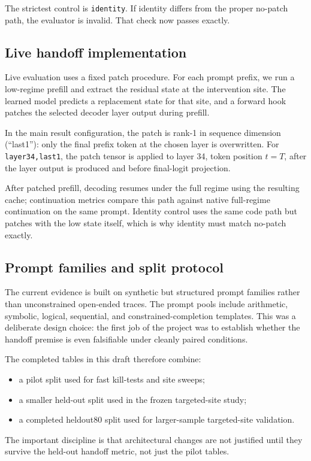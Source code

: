 \documentclass[11pt]{article}
\newcommand{\method}[1]{\texttt{#1}}
\begin{document}
The strictest control is \method{identity}. If identity differs from the proper no-patch path, the evaluator is invalid. That check now passes exactly.

\subsection{Live handoff implementation}
Live evaluation uses a fixed patch procedure. For each prompt prefix, we run a low-regime prefill and extract the residual state at the intervention site. The learned model predicts a replacement state for that site, and a forward hook patches the selected decoder layer output during prefill.

In the main result configuration, the patch is rank-1 in sequence dimension (``last1''): only the final prefix token at the chosen layer is overwritten. For \method{layer34,last1}, the patch tensor is applied to layer 34, token position $t=T$, after the layer output is produced and before final-logit projection.

After patched prefill, decoding resumes under the full regime using the resulting cache; continuation metrics compare this path against native full-regime continuation on the same prompt. Identity control uses the same code path but patches with the low state itself, which is why identity must match no-patch exactly.

\subsection{Prompt families and split protocol}
The current evidence is built on synthetic but structured prompt families rather than unconstrained open-ended traces. The prompt pools include arithmetic, symbolic, logical, sequential, and constrained-completion templates. This was a deliberate design choice: the first job of the project was to establish whether the handoff premise is even falsifiable under cleanly paired conditions.

The completed tables in this draft therefore combine:
\begin{itemize}[leftmargin=1.4em]
    \item a pilot split used for fast kill-tests and site sweeps;
    \item a smaller held-out split used in the frozen targeted-site study;
    \item a completed heldout80 split used for larger-sample targeted-site validation.
\end{itemize}
The important discipline is that architectural changes are not justified until they survive the held-out handoff metric, not just the pilot tables.
\end{document}
